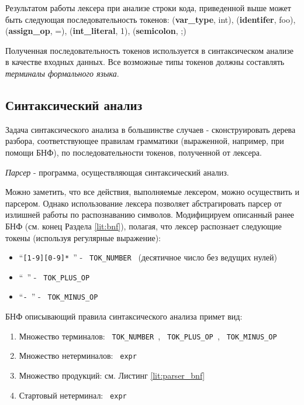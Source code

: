 Результатом работы лексера при анализе строки кода, приведенной выше может быть следующая последовательность токенов: (\textbf{var\_type}, int), (\textbf{identifer}, foo), (\textbf{assign\_op}, =), (\textbf{int\_literal}, 1), (\textbf{semicolon}, ;)

Полученная последовательность токенов используется в синтаксическом анализе в качестве входных данных. Все возможные типы токенов должны составлять \textit{терминалы формального языка}.

\subsection{Синтаксический анализ}
Задача синтаксического анализа в большинстве случаев - сконструировать дерева разбора, соответствующее правилам грамматики (выраженной, например, при помощи БНФ), по последовательности токенов, полученной от лексера.

\textit{Парсер} - программа, осуществляющая синтаксический анализ. 

Можно заметить, что все действия, выполняемые лексером, можно осуществить и парсером. Однако использование лексера позволяет абстрагировать парсер от излишней работы по распознаванию символов. Модифицируем описанный ранее БНФ (см. конец Раздела \ref{lit:bnf}), полагая, что лексер распознает следующие токены (используя регулярные выражение):
\begin{itemize}
    \item \enquote{\texttt{[1-9][0-9]* }} - \texttt{ TOK_NUMBER } (десятичное число без ведущих нулей)
    \item \enquote{\texttt{\+ }} - \texttt{ TOK_PLUS_OP }
    \item \enquote{\texttt{- }} - \texttt{ TOK_MINUS_OP }
\end{itemize}

БНФ описывающий правила синтаксического анализа примет вид:
\begin{enumerate}
    \item Множество терминалов: \texttt{ TOK_NUMBER }, \texttt{ TOK_PLUS_OP }, \texttt{ TOK_MINUS_OP }
    \item Множество нетерминалов: \texttt{ expr }
    \item Множество продукций: см. Листинг \ref{lit:parser_bnf}
    \item Стартовый нетерминал: \texttt{ expr }
\end{enumerate}

